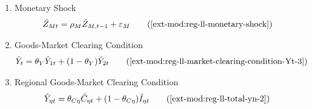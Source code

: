 \documentclass[../thesis.tex]{subfiles}
\begin{document}
{\begin{itemize}
\begin{enumerate}
			\item Monetary Shock
			\begin{alignat}{2}
				\hat{Z}_{Mt} &= \rho_M \hat{Z}_{M,t-1} + \varepsilon_{M} \tag{\ref{ext-mod:reg-ll-monetary-shock}}
			\end{alignat}
			
			\item Goods-Market Clearing Condition
			\begin{align}
				\hat{Y}_{t} &= \theta_{Y} \hat{Y}_{1t} + (1-\theta_{Y}) \hat{Y}_{2t} \tag{\ref{ext-mod:reg-ll-market-clearing-condition-Yt-3}}
			\end{align}
			
			\item Regional Goods-Market Clearing Condition
			\begin{align}
				\hat{Y}_{\eta t} &= \theta_{C\eta} \hat{C}_{\eta t} + (1 - \theta_{C\eta}) \hat{I}_{\eta t} \tag{\ref{ext-mod:reg-ll-total-yn-2}}
			\end{align}
			
		\end{enumerate}
		
	\end{itemize}
	
} %



\newpage
\end{document}

